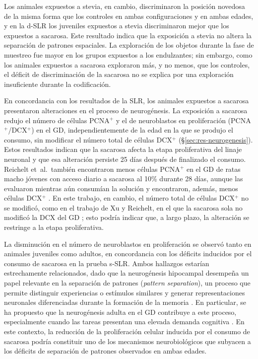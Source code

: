 Los animales expuestos a stevia, en cambio, discriminaron la posición novedosa de la misma forma que los controles en ambas configuraciones y en ambas edades, y en la d-SLR los juveniles expuestos a stevia discriminaron mejor que los expuestos a sacarosa. Este resultado indica que la exposición a stevia no altera la separación de patrones espaciales. La exploración de los objetos durante la fase de muestreo fue mayor en los grupos expuestos a los endulzantes; sin embargo, como los animales expuestos a sacarosa exploraron más, y no menos, que los controles, el déficit de discriminación de la sacarosa no se explica por una exploración insuficiente durante la codificación.

En concordancia con los resultados de la SLR, los animales expuestos a sacarosa presentaron alteraciones en el proceso de neurogénesis. La exposición a sacarosa redujo el número de células PCNA$^{+}$ y el de neuroblastos en proliferación (PCNA$^{+}$/DCX$^{+}$) en el GD, independientemente de la edad en la que se produjo el consumo, sin modificar el número total de células DCX$^{+}$ (\S\ref{sec:res-neurogenesis}). Estos resultados indican que la sacarosa afecta la etapa proliferativa del linaje neuronal \cite{kempermann2015neurogenesis} y que esa alteración persiste 25 días después de finalizado el consumo. Reichelt et~al.\ también encontraron menos células PCNA$^{+}$ en el GD de ratas macho jóvenes con acceso diario a sacarosa al 10\% durante 28 días, aunque las evaluaron mientras aún consumían la solución y encontraron, además, menos células DCX$^{+}$ \cite{reichelt2016sucrose}. En este trabajo, en cambio, el número total de células DCX$^{+}$ no se modificó, como en el trabajo de Xu y Reichelt, en el que la sacarosa sola no modificó la DCX del GD \cite{xu2018sucrose}; esto podría indicar que, a largo plazo, la alteración se restringe a la etapa proliferativa.

La disminución en el número de neuroblastos en proliferación se observó tanto en animales juveniles como adultos, en concordancia con los déficits inducidos por el consumo de sacarosa en la prueba s-SLR. Ambos hallazgos estarían estrechamente relacionados, dado que la neurogénesis hipocampal desempeña un papel relevante en la separación de patrones (\textit{pattern separation}), un proceso que permite distinguir experiencias o estímulos similares y generar representaciones neuronales diferenciadas durante la formación de la memoria \cite{reichelt2016sucrose}. En particular, se ha propuesto que la neurogénesis adulta en el GD contribuye a este proceso, especialmente cuando las tareas presentan una elevada demanda cognitiva \cite{reichelt2016sucrose,reichelt2021slr}. En este contexto, la reducción de la proliferación celular inducida por el consumo de sacarosa podría constituir uno de los mecanismos neurobiológicos que subyacen a los déficits de separación de patrones observados en ambas edades.

